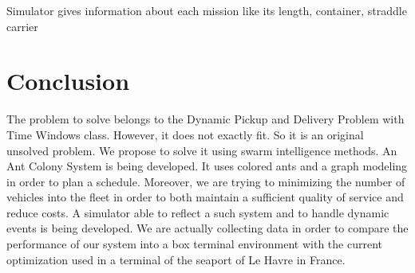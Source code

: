 \documentclass[a4paper,10pt]{article}
\makeatletter
\newenvironment{figurehere}
{\def\@captype{figure}}
{}
\makeatother
\begin{document}
\begin{multicols}{2}
Simulator gives information about each mission like its length, container, straddle carrier 

\begin{figurehere}
	\label{acoview}
\end{figurehere}


\section{Conclusion}

The problem to solve belongs to the Dynamic Pickup and Delivery Problem with Time Windows class. However, it does not exactly fit. So it is an original unsolved problem. We propose to solve it using swarm intelligence methods. An Ant Colony System is being developed. It uses colored ants and a graph modeling in order to plan a schedule. Moreover, we are trying to minimizing the number of vehicles into the fleet in order to both maintain a sufficient quality of service and reduce costs. A simulator able to reflect a such system and to handle dynamic events is being developed. We are actually collecting data in order to compare the performance of our system into a box terminal environment with the current optimization used in a terminal of the seaport of Le Havre in France.



\end{multicols}
\end{document}
